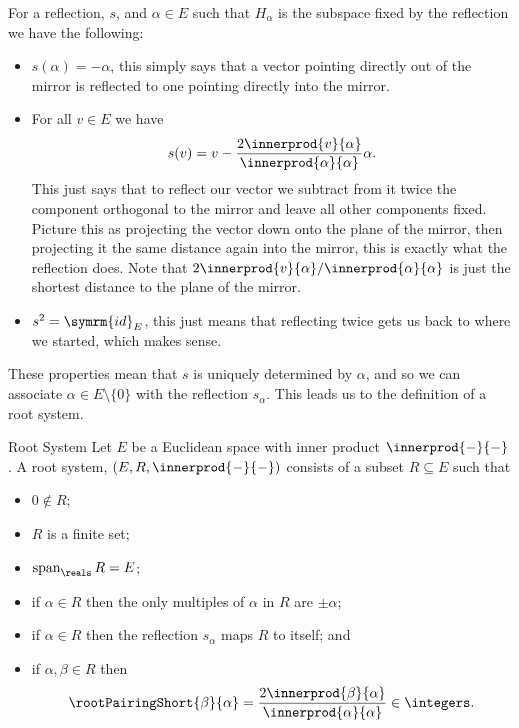 \documentclass[fleqn]{NotesClass}
\DeclareMathOperator{\Span}{span}
\newcommand{\id}{\symrm{id}}
\begin{document}
    For a reflection, \(s\), and \(\alpha \in E\) such that \(H_\alpha\) is the subspace fixed by the reflection we have the following:
    \begin{itemize}
        \item \(s(\alpha) = -\alpha\), this simply says that a vector pointing directly out of the mirror is reflected to one pointing directly into the mirror.
        \item For all \(v \in E\) we have
        \begin{equation}
            s(v) = v - \frac{2\innerprod{v}{\alpha}}{\innerprod{\alpha}{\alpha}} \alpha.
        \end{equation}
        This just says that to reflect our vector we subtract from it twice the component orthogonal to the mirror and leave all other components fixed.
        Picture this as projecting the vector down onto the plane of the mirror, then projecting it the same distance again into the mirror, this is exactly what the reflection does.
        Note that \(2\innerprod{v}{\alpha}/\innerprod{\alpha}{\alpha}\) is just the shortest distance to the plane of the mirror.
        \item \(s^2 = \id_E\), this just means that reflecting twice gets us back to where we started, which makes sense.
    \end{itemize}
    
    These properties mean that \(s\) is uniquely determined by \(\alpha\), and so we can associate \(\alpha \in E\setminus\{0\}\) with the reflection \(s_\alpha\).
    This leads us to the definition of a root system.
    
    \begin{dfn}{Root System}{}
        Let \(E\) be a Euclidean space with inner product \(\innerprod{-}{-}\).
        A root system, \((E, R, \innerprod{-}{-})\) consists of a subset \(R \subseteq E\) such that
        \begin{itemize}
            \item \(0 \notin R\);
            \item \(R\) is a finite set;
            \item \(\Span_{\reals} R = E\);
            \item if \(\alpha \in R\) then the only multiples of \(\alpha\) in \(R\) are \(\pm \alpha\);
            \item if \(\alpha \in R\) then the reflection \(s_\alpha\) maps \(R\) to itself; and
            \item if \(\alpha, \beta \in R\) then
            \begin{equation}
                \rootPairingShort{\beta}{\alpha} = \frac{2\innerprod{\beta}{\alpha}}{\innerprod{\alpha}{\alpha}} \in \integers.
            \end{equation}
        \end{itemize}
    \end{dfn}
    
\end{document}

